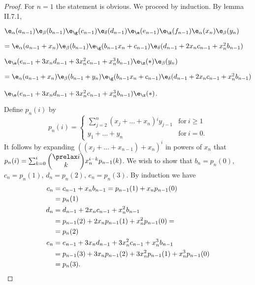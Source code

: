 \documentclass{memo-l}
\theoremstyle{definition}
\theoremstyle{remark}
\numberwithin{section}{chapter}
\numberwithin{equation}{chapter}
\begin{document}
\begin{proof}    For $n = 1$ the statement is obvious.
 We proceed by induction.  By lemma II.7.1,

${\e}_{\alpha}(a_{n-1}){\e}_{\beta}(b_{n-1})
{\e}_{{\g}}(c_{n-1}){\e}_{{\delta}}(d_{n-1})
{\e}_{{\e}}(e_{n-1}){\e}_{{\z}}(f_{n-1})
{\e}_{\alpha}(x_{n}){\e}_{\beta}(y_{n})$

$= {\e}_{\alpha}(a_{n-1}+x_{n}){\e}_{\beta}(b_{n-1})
{\e}_{{\g}}(b_{n-1}x_{n}+c_{n-1}){\e}_{{\delta}}
(d_{n-1}+2x_{n}c_{n-1}+x_{n}^{2}b_{n-1})$

${\e}_{{\e}}(e_{n-1}+3x_{n}d_{n-1}+3x_{n}^{2}c_{n-1} +
x_{n}^{3}b_{n-1}){\e}_{{\z}}(*){\e}_{\beta}(y_{n})$

$= {\e}_{\alpha}(a_{n-1}+x_{n}){\e}_{\beta}(b_{n-1}+y_{n})
{\e}_{{\g}}(b_{n-1}x_{n}+c_{n-1}){\e}_{{\delta}}(d_{n-1} +
2x_{n}c_{n-1}+x_{n}^{2}b_{n-1})$

${\e}_{{\e}}(e_{n-1}+3x_{n}d_{n-1}+3x_{n}^{2}c_{n-1} +
x_{n}^{3}b_{n-1}){\e}_{{\z}}(*)$.

\noindent
Define $p_{n}(i)$ by
$$
p_n(i) = \begin{cases}
\sum^n_{j=2} (x_j +\ldots +x_n){}^iy_{j-1} & {\text{for}}\ i \ge 1 \\
y_{1} + \ldots + y_{n} & {\text{for}}\  i = 0   .
\end{cases}
$$
It follows by expanding $((x_{j}+\ldots +x_{n-1})+x_{n})^{i}$ in powers of
$x_{n}$ that
\newline
$p_{n}(i) = \sum^i_{k=0} {\begin{pmatrix} \prelax  i \\ k \end{pmatrix}} x_{n}^{i-k}p_{n-1}(k)$.
 We wish to show that $b_{n} = p_{n}(0)$, $c_{n} = p_{n}(1)$, $d_{n} = p_{n}(2)$,
$e_{n} = p_{n}(3)$.
 By induction we have
$$
\aligned
c_{n} &= c_{n-1} + x_{n}b_{n-1} = p_{n-1}(1) + x_{n}p_{n-1}(0) \\
      &= p_{n}(1)\\
d_{n} &= d_{n-1}+2x_{n}c_{n-1}+x_{n}^{2}b_{n-1}  \\
      &= p_{n-1}(2)+2x_{n}p_{n-1}(1)+x_{n}^{2}p_{n-1}(0) = \\
      &= p_{n}(2) \\
e_{n} &= e_{n-1}+3x_{n}d_{n-1}+3x_{n}^{2}c_{n-1}+x_{n}^{3}b_{n-1} \\
      &= p_{n-1}(3)+3x_{n}p_{n-1}(2)+3x_{n}^{2}p_{n-1}(1)+x_{n}^{3}p_{n-1}(0) \\
      &= p_{n}(3).
\endaligned
$$
\end{proof}
\end{document}
